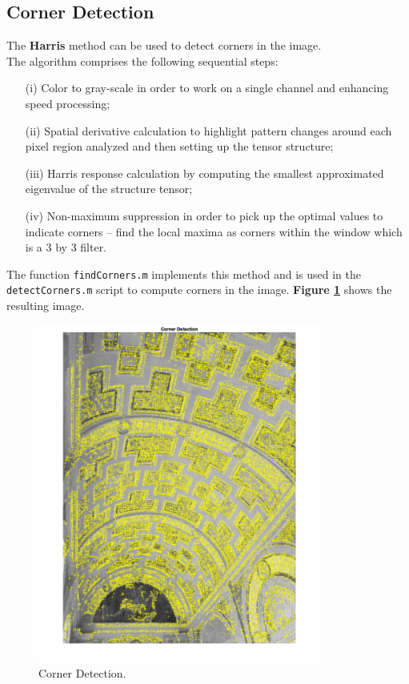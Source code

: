 \documentclass[12pt,a4paper]{article}
\begin{document}
\subsection{Corner Detection}
\label{sec:cornerDetection}
The \textbf{Harris} method can be used to detect corners in the image.\\

The algorithm comprises the following sequential steps:
\begin{itemize}
    \item[(i)] Color to gray-scale in order to work on a single channel and enhancing speed processing;
    \item[(ii)] Spatial derivative calculation to highlight pattern changes around each pixel region analyzed and then setting up the tensor structure;
    \item[(iii)] Harris response calculation by computing the smallest approximated eigenvalue of the structure tensor;
    \item[(iv)] Non-maximum suppression in order to pick up the optimal values to indicate corners -- find the local maxima as corners within the window which is a 3 by 3 filter.
\end{itemize}
\bigskip
The function \verb|findCorners.m| implements this method and is used in the \verb|detectCorners.m| script to compute corners in the image. \textbf{Figure \ref{fig:corners}} shows the resulting image.

\begin{figure}[H]
    \centering
    \includegraphics[width=0.83\textwidth]{Images/PalazzoTe_corners.png}
    \caption[Corner Detection.]{Corner Detection.}
    \label{fig:corners}
\end{figure}
\end{document}
